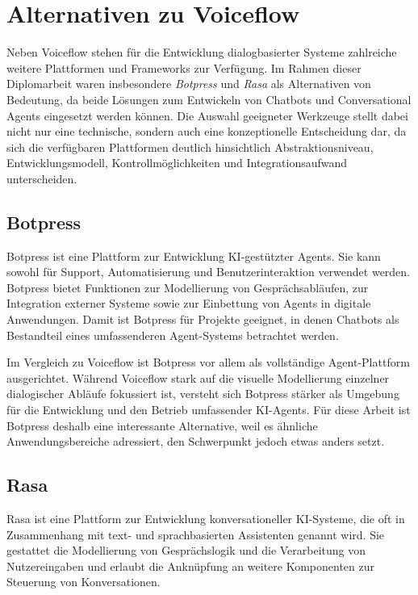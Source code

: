 \section{Alternativen zu Voiceflow}

Neben Voiceflow stehen für die Entwicklung dialogbasierter Systeme zahlreiche weitere
Plattformen und Frameworks zur Verfügung. Im Rahmen dieser Diplomarbeit waren insbesondere
\textit{Botpress} und \textit{Rasa} als Alternativen von Bedeutung, da beide Lösungen zum
Entwickeln von Chatbots und Conversational Agents eingesetzt werden können. Die Auswahl
geeigneter Werkzeuge stellt dabei nicht nur eine technische, sondern auch eine
konzeptionelle Entscheidung dar, da sich die verfügbaren Plattformen deutlich hinsichtlich
Abstraktionsniveau, Entwicklungsmodell, Kontrollmöglichkeiten und Integrationsaufwand
unterscheiden.

\subsection{Botpress}

Botpress ist eine Plattform zur Entwicklung KI-gestützter Agents. Sie kann sowohl
für Support, Automatisierung und Benutzerinteraktion verwendet werden.
Botpress bietet Funktionen zur Modellierung von Gesprächsabläufen, zur Integration 
externer Systeme sowie zur Einbettung von Agents in digitale Anwendungen. 
Damit ist Botpress für Projekte geeignet, in denen Chatbots als Bestandteil eines 
umfassenderen Agent-Systems betrachtet werden.

Im Vergleich zu Voiceflow ist Botpress vor allem 
als vollständige Agent-Plattform ausgerichtet. Während Voiceflow stark auf die 
visuelle Modellierung einzelner dialogischer Abläufe fokussiert ist, versteht 
sich Botpress stärker als Umgebung für die Entwicklung und den Betrieb 
umfassender KI-Agents. Für diese Arbeit ist Botpress deshalb eine 
interessante Alternative, weil es ähnliche Anwendungsbereiche adressiert, den 
Schwerpunkt jedoch etwas anders setzt.

\subsection{Rasa}

Rasa ist eine Plattform zur Entwicklung konversationeller KI-Systeme, die oft in 
Zusammenhang mit text- und sprachbasierten Assistenten genannt wird. Sie 
gestattet die Modellierung von Gesprächslogik und die Verarbeitung von 
Nutzereingaben und erlaubt die Anknüpfung an weitere Komponenten zur Steuerung 
von Konversationen.

